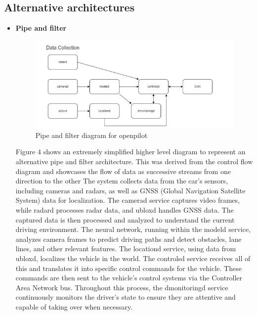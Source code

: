 \documentclass[12pt]{article}
\begin{document}
\newpage
\subsection{Alternative architectures}

    \begin{itemize}
        \item[] \textbf{Pipe and filter}

        \begin{figure}[ht]
        \centering
            \includegraphics[scale=0.7]{Assets/pipeandfilter.PNG}
            \caption{Pipe and filter diagram for openpilot}
            \label{fig:enter-label}
        \end{figure}
         Figure 4 shows an extremely simplified higher level diagram  to represent an alternative
         pipe and filter architecture. This was derived from the control flow diagram and showcases the flow of data as successive streams from one direction to the other The system collects data from the car's sensors, including cameras and radars, as well as GNSS (Global Navigation Satellite System) data for localization. The camerad service captures video frames, while radard processes radar data, and ubloxd handles GNSS data. The captured data is then processed and analyzed to understand the current driving environment. The neural network, running within the modeld service, analyzes camera frames to predict driving paths and detect obstacles, lane lines, and other relevant features. The locationd service, using data from ubloxd, localizes the vehicle in the world. The controlsd service receives all of this and translates it into specific control commands for the vehicle. These commands are then sent to the vehicle's control systems via the Controller Area Network bus. Throughout this process, the dmonitoringd service continuously monitors the driver's state to ensure they are attentive and capable of taking over when necessary.


\end{itemize}
\end{document}
